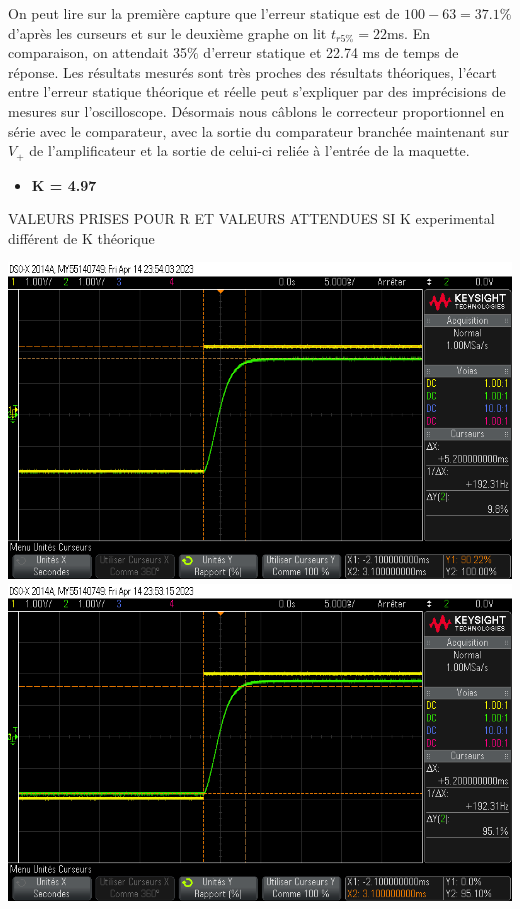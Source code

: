 \documentclass[12pt]{article}
\begin{document}
On peut lire sur la première capture que l'erreur statique est de $100 - 63 = 37.1\%$ d'après les curseurs et sur le deuxième graphe on lit $t_{r5\%} = 22$ms.
En comparaison, on attendait 35$\%$ d'erreur statique et 22.74 ms de temps de réponse. Les résultats mesurés sont très proches des résultats théoriques, l'écart entre l'erreur statique théorique et réelle peut s'expliquer par des imprécisions de mesures sur l'oscilloscope.
Désormais nous câblons le correcteur proportionnel en série avec le comparateur, avec la sortie du comparateur branchée maintenant sur $V_+$ de l'amplificateur et la sortie de celui-ci reliée à l'entrée de la maquette.
\newpage \begin{itemize}
\item \bf \large K = 4.97
\end{itemize}
\large VALEURS PRISES POUR R ET VALEURS ATTENDUES SI K experimental différent de K théorique
\begin{center}
    \includegraphics[width = 18 cm]{TP3/Syst_1/P/14_04_2023_es_k5.png}
    \includegraphics[width = 18 cm]{TP3/Syst_1/P/14_04_2023_tr_k5.png}
\end{center}
\end{document}
